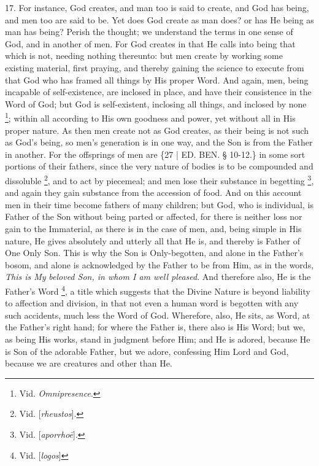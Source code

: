 17. For instance, God creates,
and man too is said to create, and God has being, and men too are said
to be. Yet does God create as man does? or has He being as man has
being? Perish the thought; we understand the terms in one sense of
God, and in another of men. For God creates in that He calls into
being that which is not, needing nothing thereunto: but men create by
working some existing material, first praying, and thereby gaining the
science to execute from that God who has framed all things by His
proper Word. And again, men, being incapable of self-existence, are
inclosed in place, and have their consistence in the Word of God; but
God is self-existent, inclosing all things, and inclosed by none \footnote{Vid. \emph{Omnipresence}.}; within all according to His own goodness and power, yet
without all in His proper nature. As then men create not as God
creates, as their being is not such as God's being, so men's
generation is in one way, and the Son is from the Father in another.
For the offsprings of men are \{27 | ED.
BEN.
§ 10-12.\} in some sort portions of their fathers, since the very
nature of bodies is to be compounded and dissoluble \footnote{Vid. [\emph{rheustos}].}, and to act by piecemeal; and men lose their substance in
begetting \footnote{Vid. [\emph{aporrho\={e}}].}, and again
they gain substance from the accession of food. And on this account
men in their time become fathers of many children; but God, who is
individual, is Father of the Son without being parted or affected, for
there is neither loss nor gain to the Immaterial, as there is in the
case of men, and, being simple in His nature, He gives absolutely and
utterly all that He is, and thereby is Father of One Only Son. This is
why the Son is Only-begotten, and alone in the Father's bosom, and
alone is acknowledged by the Father to be from Him, as in the words, \emph{This
is My} \emph{beloved Son, in whom I am well pleased}. And therefore
also, He is the Father's Word \footnote{Vid. [\emph{logos}]}, a title which suggests that the Divine Nature is beyond
liability to affection and division, in that not even a human word is
begotten with any such accidents, much less the Word of God.
Wherefore, also, He sits, as Word, at the Father's right hand; for
where the Father is, there also is His Word; but we, as being His
works, stand in judgment before Him; and He is adored, because He is
Son of the adorable Father, but we adore, confessing Him Lord and God,
because we are creatures and other than He.

